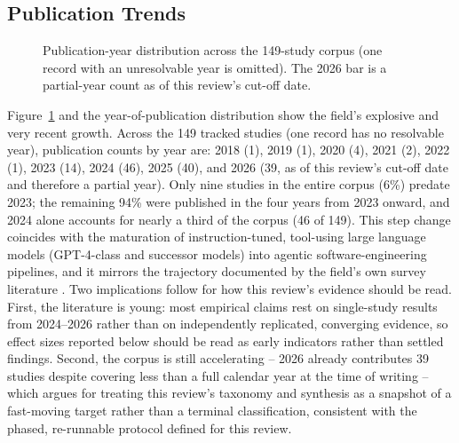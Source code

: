 \subsection{Publication Trends}
\label{subsec:pub-trends}

\begin{figure}[t]
\centering
{}
\caption{Publication-year distribution across the 149-study corpus
(one record with an unresolvable year is omitted). The 2026 bar is a
partial-year count as of this review's cut-off date.}
\label{fig:pub-trend}
\end{figure}

Figure~\ref{fig:pub-trend} and the year-of-publication distribution show the field's explosive and
very recent growth. Across the 149 tracked studies (one record has no
resolvable year), publication counts by year are: 2018 (1), 2019 (1),
2020 (4), 2021 (2), 2022 (1), 2023 (14), 2024 (46), 2025 (40), and
2026 (39, as of this review's cut-off date and therefore a partial
year). Only nine studies in the entire corpus (6\%) predate 2023; the
remaining 94\% were published in the four years from 2023 onward, and
2024 alone accounts for nearly a third of the corpus (46 of 149).
This step change coincides with the maturation of instruction-tuned,
tool-using large language models (GPT-4-class and successor models)
into agentic software-engineering pipelines, and it mirrors the
trajectory documented by the field's own survey literature
\cite{slr0012024,slr0022024,slr0032023,slr0042024,slr0052024,slr0062024}.
Two implications follow for how this review's evidence should be
read. First, the literature is young: most empirical claims rest on
single-study results from 2024--2026 rather than on independently
replicated, converging evidence, so effect sizes reported below should
be read as early indicators rather than settled findings. Second, the
corpus is still accelerating -- 2026 already contributes 39 studies
despite covering less than a full calendar year at the time of
writing -- which argues for treating this review's taxonomy and
synthesis as a snapshot of a fast-moving target rather than a
terminal classification, consistent with the phased, re-runnable
protocol defined for this review.

